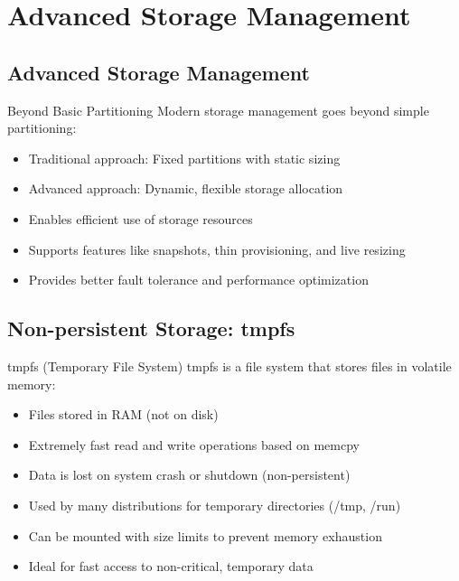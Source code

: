 \section{Advanced Storage Management}

\subsection{Advanced Storage Management}

\begin{concept}{Beyond Basic Partitioning}
    Modern storage management goes beyond simple partitioning:
    \begin{itemize}
        \item Traditional approach: Fixed partitions with static sizing
        \item Advanced approach: Dynamic, flexible storage allocation
        \item Enables efficient use of storage resources
        \item Supports features like snapshots, thin provisioning, and live resizing
        \item Provides better fault tolerance and performance optimization
    \end{itemize}
\end{concept}

\subsection{Non-persistent Storage: tmpfs}

\begin{definition}{tmpfs (Temporary File System)}
    tmpfs is a file system that stores files in volatile memory:
    \begin{itemize}
        \item Files stored in RAM (not on disk)
        \item Extremely fast read and write operations based on memcpy
        \item Data is lost on system crash or shutdown (non-persistent)
        \item Used by many distributions for temporary directories (/tmp, /run)
        \item Can be mounted with size limits to prevent memory exhaustion
        \item Ideal for fast access to non-critical, temporary data
    \end{itemize}
\end{definition}

